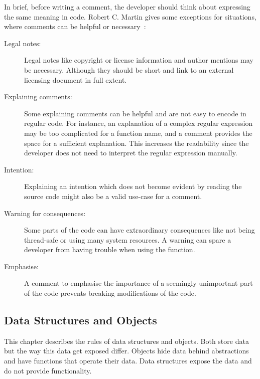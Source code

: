 In brief, before writing a comment, the developer should think about expressing the same meaning in code. Robert C. Martin gives some exceptions for situations, where comments can be helpful or necessary~\cite{martin_clean_2009}:

\begin{description}
    \item[Legal notes:] Legal notes like copyright or license information and author mentions may be necessary. Although they should be short and link to an external licensing document in full extent.
    \item[Explaining comments:] Some explaining comments can be helpful and are not easy to encode in regular code. For instance, an explanation of a complex regular expression may be too complicated for a function name, and a comment provides the space for a sufficient explanation. This increases the readability since the developer does not need to interpret the regular expression manually.
    \item[Intention:] Explaining an intention which does not become evident by reading the source code might also be a valid use-case for a comment. 
    \item[Warning for consequences:] Some parts of the code can have extraordinary consequences like not being thread-safe or using many system resources. A warning can spare a developer from having trouble when using the function.
    \item[Emphasise:] A comment to emphasise the importance of a seemingly unimportant part of the code prevents breaking modifications of the code. 
\end{description}

\subsection{Data Structures and Objects}
This chapter describes the rules of data structures and objects. Both store data but the way this data get exposed differ. Objects hide data behind abstractions and have functions that operate their data. Data structures expose the data and do not provide functionality. 

